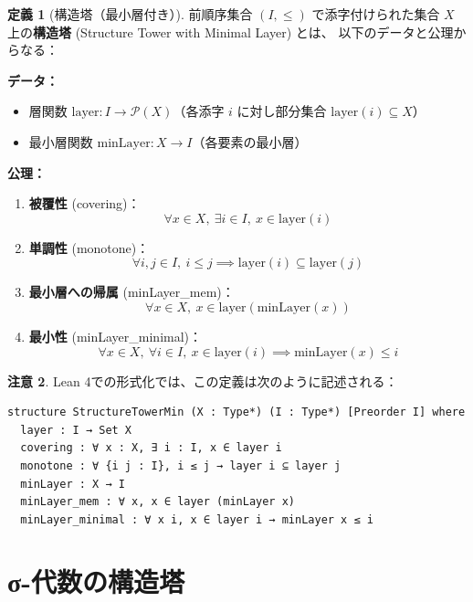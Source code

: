 \documentclass[a4paper,12pt]{ltjsarticle}
\theoremstyle{definition}
\newtheorem{definition}{定義}[section]
\newtheorem{remark}[definition]{注意}
\begin{document}
\begin{definition}[構造塔（最小層付き）]\label{def:structure-tower}
前順序集合 $(I, \leq)$ で添字付けられた集合 $X$ 上の\textbf{構造塔} (Structure Tower with Minimal Layer) とは、
以下のデータと公理からなる：

\textbf{データ：}
\begin{itemize}
  \item 層関数 $\mathrm{layer}: I \to \mathcal{P}(X)$（各添字 $i$ に対し部分集合 $\mathrm{layer}(i) \subseteq X$）
  \item 最小層関数 $\mathrm{minLayer}: X \to I$（各要素の最小層）
\end{itemize}

\textbf{公理：}
\begin{enumerate}
  \item \textbf{被覆性} (covering)：
  \[
    \forall x \in X,\ \exists i \in I,\ x \in \mathrm{layer}(i)
  \]

  \item \textbf{単調性} (monotone)：
  \[
    \forall i, j \in I,\ i \leq j \implies \mathrm{layer}(i) \subseteq \mathrm{layer}(j)
  \]

  \item \textbf{最小層への帰属} (minLayer\_mem)：
  \[
    \forall x \in X,\ x \in \mathrm{layer}(\mathrm{minLayer}(x))
  \]

  \item \textbf{最小性} (minLayer\_minimal)：
  \[
    \forall x \in X,\ \forall i \in I,\ x \in \mathrm{layer}(i) \implies \mathrm{minLayer}(x) \leq i
  \]
\end{enumerate}
\end{definition}

\begin{remark}
Lean 4での形式化では、この定義は次のように記述される：
\begin{verbatim}
structure StructureTowerMin (X : Type*) (I : Type*) [Preorder I] where
  layer : I → Set X
  covering : ∀ x : X, ∃ i : I, x ∈ layer i
  monotone : ∀ {i j : I}, i ≤ j → layer i ⊆ layer j
  minLayer : X → I
  minLayer_mem : ∀ x, x ∈ layer (minLayer x)
  minLayer_minimal : ∀ x i, x ∈ layer i → minLayer x ≤ i
\end{verbatim}
\end{remark}

\section{σ-代数の構造塔}
\end{document}
